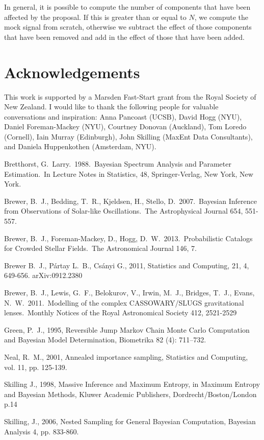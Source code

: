 \documentclass[letterpaper, 11pt]{article}
\begin{document}
In general, it is possible to compute the number of components that have been
affected by the proposal. If this is greater than or equal to $N$, we compute
the mock signal from scratch, otherwise we subtract the effect of those
components that have been removed and add in the effect of those that have been
added.

\section*{Acknowledgements}
This work is supported by a Marsden Fast-Start grant
from the Royal Society of New Zealand. I would like to thank the following
people for valuable conversations and inspiration:
Anna Pancoast (UCSB), David Hogg (NYU), Daniel Foreman-Mackey (NYU),
Courtney Donovan (Auckland), Tom Loredo (Cornell), Iain Murray (Edinburgh),
John Skilling (MaxEnt Data Consultants), and Daniela Huppenkothen
(Amsterdam, NYU).


\begin{thebibliography}{}

 Bretthorst, G.~Larry.\  1988.\
Bayesian Spectrum Analysis and Parameter Estimation.\ In Lecture Notes in
Statistics, 48, Springer-Verlag, New York, New York.

 Brewer, B.~J., Bedding, 
T.~R., Kjeldsen, H., Stello, D.\ 2007.\ Bayesian Inference from 
Observations of Solar-like Oscillations.\ The Astrophysical Journal 654, 
551-557. 

 Brewer, B.~J., 
Foreman-Mackey, D., Hogg, D.~W.\ 2013.\ Probabilistic Catalogs for Crowded 
Stellar Fields.\ The Astronomical Journal 146, 7. 

 Brewer B.~J., P{\'a}rtay L.~B., Cs{\'a}nyi G., 2011,
Statistics and Computing, 21, 4, 649-656. arXiv:0912.2380

 Brewer, B.~J., Lewis,
G.~F., Belokurov, V., Irwin, M.~J., Bridges, T.~J., Evans, N.~W.\ 2011.\
Modelling of the complex CASSOWARY/SLUGS gravitational lenses.\ Monthly
Notices of the Royal Astronomical Society 412, 2521-2529

Green, P.~J., 1995, Reversible Jump Markov Chain Monte Carlo Computation and Bayesian Model Determination, Biometrika 82 (4): 711–732.

\bibitem[Neal(2001)]{neal} Neal, R.~M., 2001, 
Annealed importance sampling, Statistics and Computing, vol. 11, pp. 125-139.

\bibitem[\protect\citeauthoryear{Skilling}{1998}]{massinf}
Skilling J., 1998, Massive Inference and Maximum Entropy, in Maximum Entropy
and Bayesian Methods, Kluwer Academic Publishers, Dordrecht/Boston/London p.14

\bibitem[\protect\citeauthoryear{Skilling}{2006}]{skilling} Skilling, J., 2006, Nested Sampling for General Bayesian Computation, Bayesian Analysis 4, pp. 833-860.


\end{thebibliography}
\end{document}

